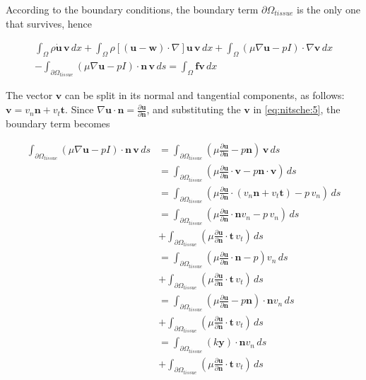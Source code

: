 \documentclass[11pt,a4paper,titlepage]{report}
\begin{document}
According to the boundary conditions, the boundary term $\partial \Omega_{tissue}$ is the only one that survives, hence

\begin{align*}
 \int_{\Omega} \rho \dot{\mathbf{u}} \, \mathbf{v} \, dx
+ \int_{\Omega} \rho [(\mathbf{u - w}) \cdot \nabla] \mathbf{u} \, \mathbf{v} \, dx
+ \int_{\Omega} (\mu \nabla \mathbf{u} - pI) \cdot \nabla \mathbf{v} \, dx \\
- \int_{\partial \Omega_{tissue}} (\mu \nabla \mathbf{u} - pI) \cdot \mathbf{n} \, \mathbf{v} \, ds
= \int_{\Omega} \mathbf{f} \mathbf{v} \, dx
\end{align*}

The vector $\mathbf{v}$ can be split in its normal and tangential components, as follows: $\mathbf{v} = v_n \mathbf{n} + v_t \mathbf{t}$. Since $\nabla \mathbf{u} \cdot \mathbf{n} = \frac{\partial \mathbf{u}}{\partial \mathbf{n}}$, and substituting the $\mathbf{v}$ in \eqref{eq:nitsche:5},  the boundary term becomes


\begin{align}
\label{eq:nitsche:5}
\int_{\partial \Omega_{tissue}} (\mu \nabla \mathbf{u} -  pI) \cdot \mathbf{n} \, \mathbf{v} \, ds 
&= \int_{\partial \Omega_{tissue}} (\mu \frac{\partial \mathbf{u}}{\partial \mathbf{n}} -  p \mathbf{n}) \, \mathbf{v} \, ds \\
&= \int_{\partial \Omega_{tissue}} (\mu \frac{\partial \mathbf{u}}{\partial \mathbf{n}} \cdot \mathbf{v} -  p \mathbf{n} \cdot \mathbf{v}) \, ds \\
&= \int_{\partial \Omega_{tissue}} (\mu \frac{\partial \mathbf{u}}{\partial \mathbf{n}} \cdot (v_n \mathbf{n} + v_t \mathbf{t}) -  p \, v_n) \, ds \\
&= \int_{\partial \Omega_{tissue}} (\mu \frac{\partial \mathbf{u}}{\partial \mathbf{n}} \cdot \mathbf{n} v_n -  p \, v_n) \, ds \\
& + \int_{\partial \Omega_{tissue}} (\mu \frac{\partial \mathbf{u}}{\partial \mathbf{n}} \cdot \mathbf{t} \, v_t) \, ds \\
&= \int_{\partial \Omega_{tissue}} (\mu \frac{\partial \mathbf{u}}{\partial \mathbf{n}} \cdot \mathbf{n} -  p) v_n \, ds \\
& + \int_{\partial \Omega_{tissue}} (\mu \frac{\partial \mathbf{u}}{\partial \mathbf{n}} \cdot \mathbf{t} \, v_t) \, ds \\
&= \int_{\partial \Omega_{tissue}} (\mu \frac{\partial \mathbf{u}}{\partial \mathbf{n}} -  p \mathbf{n}) \cdot \mathbf{n} v_n \, ds \\
& + \int_{\partial \Omega_{tissue}} (\mu \frac{\partial \mathbf{u}}{\partial \mathbf{n}} \cdot \mathbf{t} \, v_t) \, ds \\
&= \int_{\partial \Omega_{tissue}} (k \mathbf{y}) \cdot \mathbf{n} v_n \, ds \\
& + \int_{\partial \Omega_{tissue}} (\mu \frac{\partial \mathbf{u}}{\partial \mathbf{n}} \cdot \mathbf{t} \, v_t) \, ds \\
\end{align}
\end{document}
